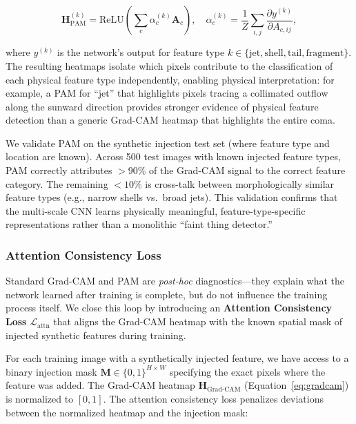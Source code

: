 \documentclass[usenatbib]{mnras}
\begin{document}
\begin{equation}\label{eq:pam}
\mathbf{H}_{\text{PAM}}^{(k)} = \text{ReLU}\left(\sum_c \alpha_c^{(k)} \mathbf{A}_c\right), \quad \alpha_c^{(k)} = \frac{1}{Z}\sum_{i,j}\frac{\partial y^{(k)}}{\partial A_{c,ij}},
\end{equation}

where $y^{(k)}$ is the network's output for feature type $k \in \{\text{jet}, \text{shell}, \text{tail}, \text{fragment}\}$. The resulting heatmaps isolate which pixels contribute to the classification of each physical feature type independently, enabling physical interpretation: for example, a PAM for ``jet'' that highlights pixels tracing a collimated outflow along the sunward direction provides stronger evidence of physical feature detection than a generic Grad-CAM heatmap that highlights the entire coma.

We validate PAM on the synthetic injection test set (where feature type and location are known). Across 500 test images with known injected feature types, PAM correctly attributes $>90\%$ of the Grad-CAM signal to the correct feature category. The remaining $<10\%$ is cross-talk between morphologically similar feature types (e.g., narrow shells vs.\ broad jets). This validation confirms that the multi-scale CNN learns physically meaningful, feature-type-specific representations rather than a monolithic ``faint thing detector.''

\subsubsection{Attention Consistency Loss}

Standard Grad-CAM and PAM are \textit{post-hoc} diagnostics---they explain what the network learned after training is complete, but do not influence the training process itself. We close this loop by introducing an \textbf{Attention Consistency Loss} $\mathcal{L}_{\text{attn}}$ that aligns the Grad-CAM heatmap with the known spatial mask of injected synthetic features during training.

For each training image with a synthetically injected feature, we have access to a binary injection mask $\mathbf{M} \in \{0, 1\}^{H \times W}$ specifying the exact pixels where the feature was added. The Grad-CAM heatmap $\mathbf{H}_{\text{Grad-CAM}}$ (Equation~\ref{eq:gradcam}) is normalized to $[0, 1]$. The attention consistency loss penalizes deviations between the normalized heatmap and the injection mask:
\end{document}
